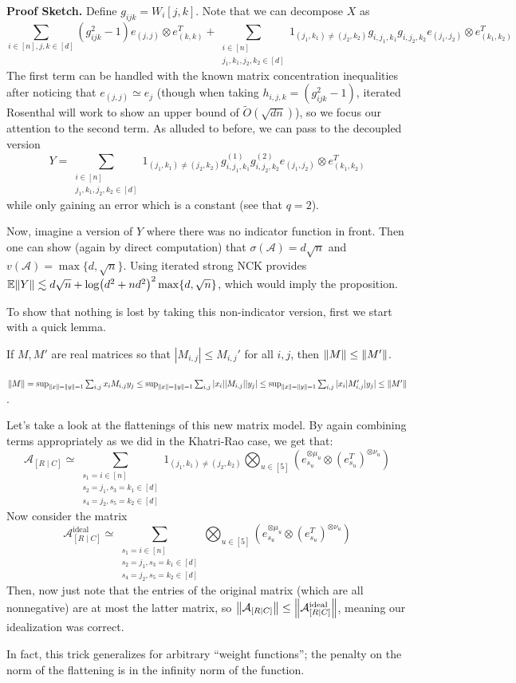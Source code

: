 \textbf{Proof Sketch.} Define $g_{ijk} = W_i[j,k]$.
Note that we can decompose $X$ as
\[ \sum_{i \in [n], j, k \in [d]} (g_{ijk}^2 - 1) e_{(j, j)} \otimes e_{(k,k)}^T + \sum_{\substack{i \in [n]\\j_1,k_1,j_2,k_2 \in [d]}} 1_{(j_1, k_1) \neq (j_2, k_2)} g_{i, j_1, k_1} g_{i, j_2, k_2} e_{(j_1, j_2)} \otimes e_{(k_1, k_2)}^T \]
The first term can be handled with the known matrix concentration inequalities after noticing that $e_{(j,j)} \simeq e_j$
(though when taking $h_{i,j,k} = (g_{ijk}^2 - 1)$,
iterated Rosenthal will work to show an upper bound of $\tilde{O}(\sqrt{dn})$), so we focus our attention to
the second term. As alluded to before, we can pass to the decoupled version
\[Y = \sum_{\substack{i \in [n]\\j_1, k_1, j_2, k_2 \in [d] }} 1_{(j_1, k_1) \neq (j_2, k_2)} g_{i, j_1, k_1}^{(1)} g_{i,j_2,k_2}^{(2)} e_{(j_1, j_2)} \otimes e_{(k_1, k_2)}^T\]
while only gaining an error which is a constant (see that $q = 2$).

Now, imagine a version of $Y$ where there was no indicator function in front. Then one can show (again by direct computation)
that $\sigma(\mathcal{A}) = d\sqrt{n}$ and $v(\mathcal{A}) = \max\{d, \sqrt{n}\}$. Using iterated strong NCK provides
$\mathbb{E} \norm{Y} \lesssim d\sqrt{n} + \log(d^2 + nd^2)^2 \max\{d, \sqrt{n}\}$,
which would imply the proposition.

To show that nothing is lost by taking this non-indicator version, first we start with a quick lemma.
\begin{lemma}
    If $M, M'$ are real matrices so that $|M_{i,j}| \le M_{i,j}'$ for all $i, j$,
    then $\norm{M} \le \norm{M'}$.
\end{lemma}

\begin{proof*}
    $\norm{M} = \sup_{\norm{x} = \norm{y} = 1} \sum_{i,j} x_i M_{i,j} y_j \le \sup_{\norm{x} = \norm{y} = 1} \sum_{i,j} |x_i| |M_{i,j}| |y_j| \le \sup_{\norm{x} = \norm{y} = 1} \sum_{i,j} |x_i| M_{i,j}' |y_j| \le  \norm{M'}$.
\end{proof*}

Let's take a look at the flattenings of this new matrix model. By again combining terms appropriately
as we did in the Khatri-Rao case, we get that:
\[ \mathcal{A}_{[R \mid C]} \simeq \sum_{\substack{s_1=i \in [n]\\s_2=j_1, s_3=k_1 \in [d] \\ s_4=j_2, s_5=k_2 \in [d] }} 1_{(j_1, k_1) \neq (j_2, k_2)}  \bigotimes_{u \in [5]} (e_{s_u}^{\otimes \mu_u} \otimes (e_{s_u}^T)^{\otimes \nu_u}) \]
Now consider the matrix
\[ \mathcal{A}_{[R \mid C]}^{\text{ideal}} \simeq \sum_{\substack{s_1=i \in [n]\\s_2=j_1, s_3=k_1 \in [d] \\ s_4=j_2, s_5=k_2 \in [d] }} \bigotimes_{u \in [5]} (e_{s_u}^{\otimes \mu_u} \otimes (e_{s_u}^T)^{\otimes \nu_u}) \]
Then, now just note that the entries of the original matrix (which are all nonnegative) are at most the latter matrix,
so $\norm{\mathcal{A}_{[R \mid C]}} \le \norm{\mathcal{A}_{[R \mid C]}^{\text{ideal}}}$, meaning our idealization was correct.

In fact, this trick generalizes for arbitrary ``weight functions''; the penalty on the
norm of the flattening is in the infinity norm of the function.




